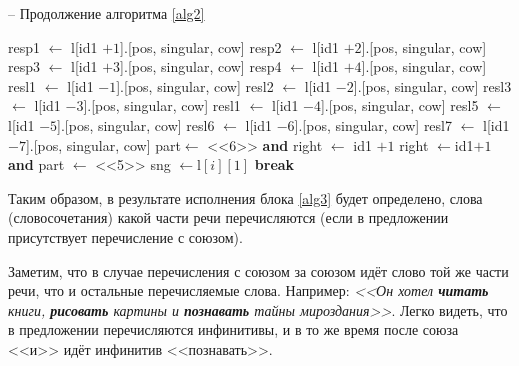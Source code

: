 \documentclass[main]{subfiles}
\begin{document}
\begin{algorithm}
	\caption{-- Продолжение алгоритма \ref{alg2}}\label{alg3}
	\begin{algorithmic}[1]
		\State resp1 $\gets$ l[id1 $+ 1$].[pos, singular, cow] 
			\EndIf
		\State resp2 $\gets$ l[id1 $+ 2$].[pos, singular, cow]
		\EndIf	
		\State resp3 $\gets$ l[id1 $+ 3$].[pos, singular, cow] 
		\EndIf
		\State resp4 $\gets$ l[id1 $+ 4$].[pos, singular, cow]
		\EndIf
		\State resl1 $\gets$ l[id1 $-1$].[pos, singular, cow]
		\EndIf
		\State resl2 $\gets$ l[id1 $-2$].[pos, singular, cow]
		\EndIf
		\State resl3 $\gets$ l[id1 $-3$].[pos, singular, cow]
		\EndIf
		\State resl1 $\gets$ l[id1 $-4$].[pos, singular, cow]
		\EndIf
		\State resl5 $\gets$ l[id1 $-5$].[pos, singular, cow]
		\EndIf
		\State resl6 $\gets$ l[id1 $-6$].[pos, singular, cow]
		\EndIf
		\State resl7 $\gets$ l[id1 $-7$].[pos, singular, cow]
		\EndIf
		 
		\State part$\gets$ <<6>> \textbf{and} right $\gets$ id1 $+1$
				\EndIf
					\EndFor
					\State right $\gets$id1$ + 1$ \textbf{and}  part $\gets$ <<5>>
					\State sng $\gets $l$[i][1]$ 
					\State \textbf{break}
							\EndIf
							\EndFor
									\EndIf
											\EndIf
	\end{algorithmic}
\end{algorithm}

Таким образом, в результате исполнения блока \ref{alg3} будет определено, слова (словосочетания) какой части речи перечисляются (если в предложении присутствует перечисление с союзом).

Заметим, что в случае перечисления с союзом за союзом идёт слово той же части речи, что и остальные перечисляемые слова. Например: \textit{<<Он хотел \textbf{читать} книги, \textbf{рисовать} картины и \textbf{познавать} тайны мироздания>>}. Легко видеть, что в предложении перечисляются инфинитивы, и в то же время после союза <<и>> идёт инфинитив <<познавать>>.
\end{document}
